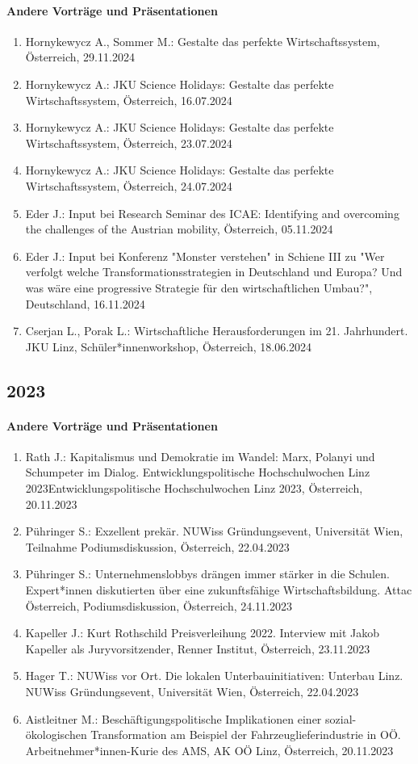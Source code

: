 \paragraph{Andere Vorträge und Präsentationen}
\begin{enumerate}
	\item Hornykewycz A., Sommer M.: Gestalte das perfekte Wirtschaftssystem, Österreich, 29.11.2024
	\item Hornykewycz A.: JKU Science Holidays: Gestalte das perfekte Wirtschaftssystem, Österreich, 16.07.2024
	\item Hornykewycz A.: JKU Science Holidays: Gestalte das perfekte Wirtschaftssystem, Österreich, 23.07.2024
	\item Hornykewycz A.: JKU Science Holidays: Gestalte das perfekte Wirtschaftssystem, Österreich, 24.07.2024
	\item Eder J.: Input bei Research Seminar des ICAE: Identifying and overcoming the challenges of the Austrian mobility, Österreich, 05.11.2024
	\item Eder J.: Input bei Konferenz "Monster verstehen" in Schiene III zu "Wer verfolgt welche Transformationsstrategien in Deutschland und Europa? Und was wäre eine progressive Strategie für den wirtschaftlichen Umbau?", Deutschland, 16.11.2024
	\item Cserjan L., Porak L.: Wirtschaftliche Herausforderungen im 21. Jahrhundert. JKU Linz, Schüler*innenworkshop, Österreich, 18.06.2024
\end{enumerate}
\subsection*{2023}
\paragraph{Andere Vorträge und Präsentationen}
\begin{enumerate}
	\item Rath J.: Kapitalismus und Demokratie im Wandel: Marx, Polanyi und Schumpeter im Dialog. Entwicklungspolitische Hochschulwochen Linz 2023Entwicklungspolitische Hochschulwochen Linz 2023, Österreich, 20.11.2023
	\item Pühringer S.: Exzellent prekär. NUWiss Gründungsevent, Universität Wien, Teilnahme Podiumsdiskussion, Österreich, 22.04.2023
	\item Pühringer S.: Unternehmenslobbys drängen immer stärker in die Schulen. Expert*innen diskutierten über eine zukunftsfähige Wirtschaftsbildung. Attac Österreich, Podiumsdiskussion, Österreich, 24.11.2023
	\item Kapeller J.: Kurt Rothschild Preisverleihung 2022. Interview mit Jakob Kapeller als Juryvorsitzender, Renner Institut, Österreich, 23.11.2023
	\item Hager T.: NUWiss vor Ort. Die lokalen Unterbauinitiativen: Unterbau Linz. NUWiss Gründungsevent, Universität Wien, Österreich, 22.04.2023
	\item Aistleitner M.: Beschäftigungspolitische Implikationen einer sozial-ökologischen Transformation am Beispiel der Fahrzeuglieferindustrie in OÖ. Arbeitnehmer*innen-Kurie des AMS, AK OÖ Linz, Österreich, 20.11.2023
\end{enumerate}
